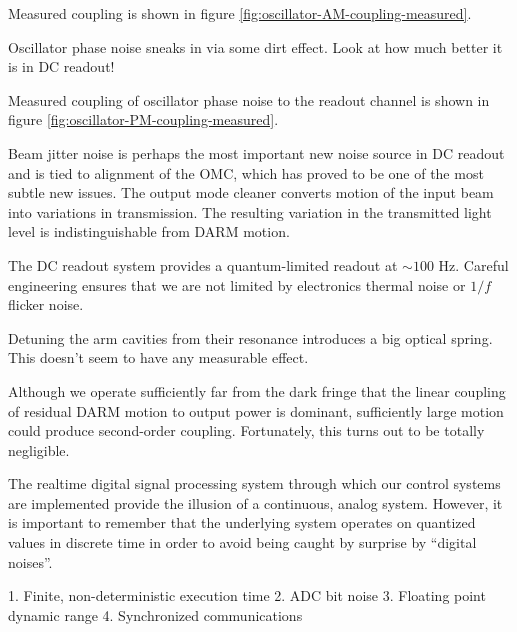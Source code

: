 Measured coupling is shown in figure \ref{fig:oscillator-AM-coupling-measured}.



%
Oscillator phase noise sneaks in via some dirt effect. Look at how
much better it is in DC readout!

Measured coupling of oscillator phase noise to the readout channel
is shown in figure \ref{fig:oscillator-PM-coupling-measured}.

%
Beam jitter noise is perhaps the most important new noise source in
DC readout and is tied to alignment of the OMC, which has proved to
be one of the most subtle new issues. The output mode cleaner converts
motion of the input beam into variations in transmission. The resulting
variation in the transmitted light level is indistinguishable from
DARM motion.

%
The DC readout system provides a quantum-limited readout at $\sim100$
Hz. Careful engineering ensures that we are not limited by electronics
thermal noise or $1/f$ flicker noise.

%
Detuning the arm cavities from their resonance introduces a big optical
spring. This doesn't seem to have any measurable effect.

%
Although we operate sufficiently far from the dark fringe that the
linear coupling of residual DARM motion to output power is dominant,
sufficiently large motion could produce second-order coupling. Fortunately,
this turns out to be totally negligible.



The realtime digital signal processing system through which our
control systems are implemented provide the illusion of a continuous,
analog system.  However, it is important to remember that the
underlying system operates on quantized values in discrete time in
order to avoid being caught by surprise by ``digital noises''.

1. Finite, non-deterministic execution time
2. ADC bit noise
3. Floating point dynamic range
4. Synchronized communications
